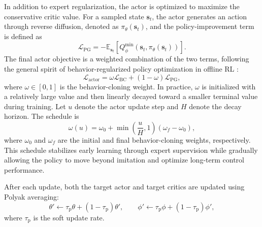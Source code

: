 \documentclass[lettersize,journal]{IEEEtran}
\theoremstyle{nonumberplain}     \theoremheaderfont{\bfseries\itshape}     \theorembodyfont{\normalfont}     \theoremseparator{:}     \theoremsymbol{\ensuremath{\blacksquare}}     \newtheorem{proof}{Proof}
\theoremstyle{plain}     \theoremheaderfont{\bfseries\itshape}     \theorembodyfont{\normalfont}     \theoremseparator{:}     \theoremsymbol{\ensuremath{\blacksquare}}     \newtheorem{remark}{Remark}
\begin{document}
In addition to expert regularization, the actor is optimized to maximize the conservative critic value. For a sampled state $\mathbf{s}_t$, the actor generates an action through reverse diffusion, denoted as $\pi_\theta(\mathbf{s}_t)$, and the policy-improvement term is defined as
\begin{equation}
\mathcal{L}_{\mathrm{PG}}
=
-
\mathbb{E}_{\mathbf{s}_t}
\left[
Q_{\phi}^{\min}(\mathbf{s}_t,\pi_\theta(\mathbf{s}_t))
\right].
\label{eq:pg_loss}
\end{equation}
The final actor objective is a weighted combination of the two terms, following the general spirit of behavior-regularized policy optimization in offline RL \cite{fujimoto2021minimalist}:
\begin{equation}
\mathcal{L}_{\mathrm{actor}}
=
\omega \mathcal{L}_{\mathrm{BC}}
+
(1-\omega)\mathcal{L}_{\mathrm{PG}},
\label{eq:actor_loss}
\end{equation}
where $\omega \in [0,1]$ is the behavior-cloning weight. In practice, $\omega$ is initialized with a relatively large value and then linearly decayed toward a smaller terminal value during training. Let $u$ denote the actor update step and $H$ denote the decay horizon. The schedule is
\begin{equation}
\omega(u)
=
\omega_0
+
\min\left(\frac{u}{H},1\right)(\omega_f-\omega_0),
\label{eq:bc_schedule}
\end{equation}
where $\omega_0$ and $\omega_f$ are the initial and final behavior-cloning weights, respectively. This schedule stabilizes early learning through expert supervision while gradually allowing the policy to move beyond imitation and optimize long-term control performance.

After each update, both the target actor and target critics are updated using Polyak averaging\cite{lillicrap2016continuous}:
\begin{equation}
\theta' \leftarrow \tau_{\mathrm{p}} \theta + (1-\tau_{\mathrm{p}})\theta',
\qquad
\phi' \leftarrow \tau_{\mathrm{p}} \phi + (1-\tau_{\mathrm{p}})\phi',
\label{eq:polyak}
\end{equation}
where $\tau_{\mathrm{p}}$ is the soft update rate.
\end{document}
